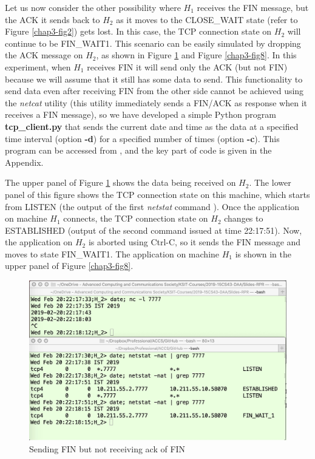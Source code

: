 \begin{multicols}{2}
Let us now consider the other possibility where $H_{1}$ receives the FIN message, but the ACK it sends back to $H_{2}$ as it moves to the CLOSE\_WAIT state (refer to Figure \ref{chap3-fig2}) gets lost. In this case, the TCP connection state on $H_{2}$ will continue to be FIN\_WAIT1. This scenario can be easily simulated by dropping the ACK message on $H_{2}$, as shown in Figure \ref{chap3-fig7} and Figure \ref{chap3-fig8}. In this experiment, when $H_{1}$ receives FIN it will send only the ACK (but not FIN) because we will assume that it still has some data to send. This functionality to send data even after receiving FIN from the other side cannot be achieved using the \textit{netcat} utility (this utility immediately sends a FIN/ACK as response when it receives a FIN message), so we have developed a simple Python program \textbf{tcp\_client.py} that sends the current date and time as the data at a specified time interval (option \textbf{-d}) for a specified number of times (option \textbf{-c}). This program can be accessed from \cite{chap3-key10}, and the key part of code is given in the Appendix.

{\parfillskip=0pt
The upper panel of Figure \ref{chap3-fig7} shows the data being received on $H_{2}$. The lower panel of this figure shows the TCP connection state on this machine, which starts from LISTEN (the output of the first \textit{netstat} command \cite{chap3-key3}\cite{chap3-key4}). Once the application on machine $H_{1}$ connects, the TCP connection state on $H_{2}$ changes to ESTABLISHED (output of the second command issued at time 22:17:51). Now, the application on $H_{2}$ is aborted using Ctrl-C, so it sends the FIN message and moves to state FIN\_WAIT1. The application on machine $H_{1}$ is shown in the upper panel of  Figure \ref{chap3-fig8}.\par}
\end{multicols}

\begin{figure}[!htb]
\centering
\includegraphics[scale=.238]{src/Figures/chap3/7.jpg}
\caption{Sending FIN but not receiving ack of FIN}\label{chap3-fig7}
\end{figure}

